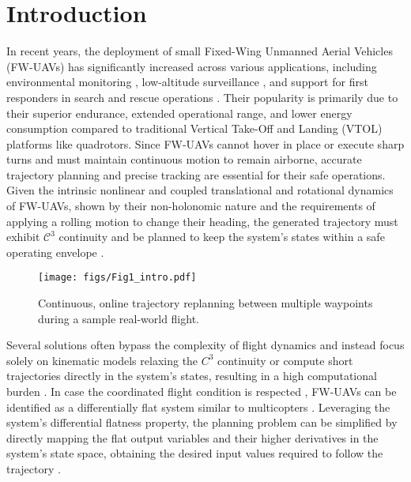 \section{Introduction}


In recent years, the deployment of small Fixed-Wing Unmanned Aerial Vehicles (FW-UAVs) has significantly increased across various applications, including environmental monitoring \cite{GREEN2019465}, low-altitude surveillance \cite{Jaimes}, and support for first responders in search and rescue operations \cite{Lyu}. Their popularity is primarily due to their superior endurance, extended operational range, and lower energy consumption compared to traditional Vertical Take-Off and Landing (VTOL) platforms like quadrotors.
Since FW-UAVs cannot hover in place or execute sharp turns and must maintain continuous motion to remain airborne, accurate trajectory planning and precise tracking are essential for their safe operations.  
Given the intrinsic nonlinear and coupled translational and rotational dynamics of FW-UAVs, shown by their non-holonomic nature and the requirements of applying a rolling motion to change their heading,  the generated trajectory must exhibit 
$\mathcal{C}^3$ continuity and be planned to keep the system's states within a safe operating envelope \cite{Tekles, Johannes}.  \begin{figure}[t!]
\texttt{[image: figs/Fig1\_intro.pdf]}
  \caption{Continuous, online trajectory replanning between multiple waypoints during a sample real-world flight.
}
  \label{fig:fig1}
\vspace{-20pt}
\end{figure}

Several solutions often bypass the complexity of flight dynamics and instead focus solely on kinematic models relaxing the $C^3$ continuity or compute short trajectories directly in the system's states, resulting in a high computational burden \cite{Barry, Levin}. In case the coordinated flight condition is respected \cite{hauser1997aggressive}, FW-UAVs can be identified as a differentially flat system similar to multicopters \cite{Mellinger}.  Leveraging the system's differential flatness property, the planning problem can be simplified by directly mapping the flat output variables and their higher derivatives in the system's state space, obtaining the desired input values required to follow the trajectory  \cite{Bry2015AggressiveFO}.


